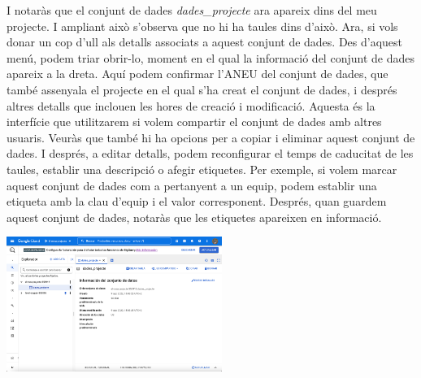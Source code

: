 \documentclass[12pt,longbibliography]{article}
\theoremstyle{definition}
\theoremstyle{remark}
\begin{document}
\par
{}%
\hfill
{}%
\par

I notaràs que el conjunt de dades \textit{dades_projecte} ara apareix dins del meu projecte. I ampliant això s'observa que no hi ha taules dins d'això. Ara, si vols donar un cop d'ull als detalls associats a aquest conjunt de dades. Des d'aquest menú, podem triar obrir-lo, moment en el qual la informació del conjunt de dades apareix a la dreta. Aquí podem confirmar l'ANEU del conjunt de dades, que també assenyala el projecte en el qual s'ha creat el conjunt de dades, i després altres detalls que inclouen les hores de creació i modificació. Aquesta és la interfície que utilitzarem si volem compartir el conjunt de dades amb altres usuaris. Veuràs que també hi ha opcions per a copiar i eliminar aquest conjunt de dades. I després, a editar detalls, podem reconfigurar el temps de caducitat de les taules, establir una descripció o afegir etiquetes. Per exemple, si volem marcar aquest conjunt de dades com a pertanyent a un equip, podem establir una etiqueta amb la clau d'equip i el valor corresponent. Després, quan guardem aquest conjunt de dades, notaràs que les etiquetes apareixen en informació.

\begin{center}
\includegraphics[width=7cm]{bq5}
\end{center}
\end{document}
